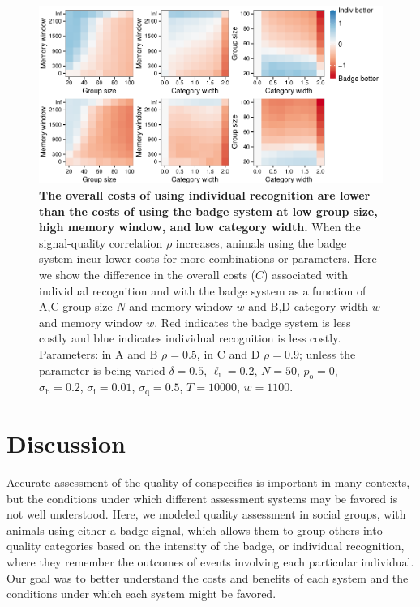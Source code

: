 \begin{figure}
\includegraphics[width=6.85in]{figures/cost_comparisons.pdf}
\caption{\sffamily\small\textbf{The overall costs of using individual recognition are lower than the costs of using the badge system at low group size, high memory window, and low category width.} When the signal-quality correlation $\rho$ increases, animals using the badge system incur lower costs for more combinations or parameters. Here we show the difference in the overall costs ($C$) associated with individual recognition and with the badge system as a function of A,C group size $N$ and memory window $w$ and B,D category width $w$ and memory window $w$. Red indicates the badge system is less costly and blue indicates individual recognition is less costly. Parameters: in A and B $\rho=0.5$, in C and D $\rho=0.9$; unless the parameter is being varied $\delta = 0.5$, $\ell_\text{i}=0.2$, $N=50$, $p_\text{o}=0$, $\sigma_\text{b}=0.2$, $\sigma_\text{i}=0.01$, $\sigma_\text{q}=0.5$, $T=10000$, $w=1100$.}
\label{comparison}
\end{figure}

\section*{Discussion}
Accurate assessment of the quality of conspecifics is important in many contexts, but the conditions under which different assessment systems may be favored is not well understood. Here, we modeled quality assessment in social groups, with animals using either a badge signal, which allows them to group others into quality categories based on the intensity of the badge, or individual recognition, where they remember the outcomes of events involving each particular individual. Our goal was to better understand the costs and benefits of each system and the conditions under which each system might be favored. 


